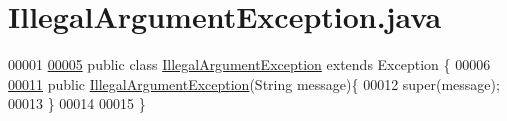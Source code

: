 \hypertarget{IllegalArgumentException_8java_source}{\section{Illegal\-Argument\-Exception.\-java}
}

\begin{DoxyCode}
00001 
\hypertarget{IllegalArgumentException_8java_source_l00005}{}\hyperlink{classIllegalArgumentException}{00005} \textcolor{keyword}{public} \textcolor{keyword}{class }\hyperlink{classIllegalArgumentException}{IllegalArgumentException} \textcolor{keyword}{extends} Exception \{
00006 
\hypertarget{IllegalArgumentException_8java_source_l00011}{}\hyperlink{classIllegalArgumentException_a46071f209a0090282c24dbcc190ebae7}{00011}     \textcolor{keyword}{public} \hyperlink{classIllegalArgumentException_a46071f209a0090282c24dbcc190ebae7}{IllegalArgumentException}(String message)\{
00012         super(message);
00013     \}
00014 
00015 \}
\end{DoxyCode}
